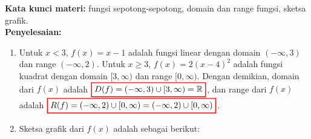 \documentclass[10pt,openany,a4paper]{article}
\theoremstyle{definition}
\theoremstyle{definition}
\theoremstyle{plain}
\newenvironment{jawab}[2][tes]{
\textbf{Kata kunci materi:} #1.\\
\textbf{Penyelesaian:} #2
}{}
\begin{document}
\begin{enumerate}
\begin{jawab}[fungsi sepotong-sepotong, domain dan range fungsi, sketsa grafik]
{\begin{enumerate}
\begin{align*}
                        f(-2) &= -2-1 = -3\\
                        f(1-x^2) &= (1-x^2)-1 = -x^2.
                    \end{align*}
                    Jadi diperoleh $\colorlet{oldcolor}{.}
        \color{red}
        \setlength{\fboxrule}{1pt} \boxed{\color{oldcolor}f(3)=2,~f(-2)=-3,~f(1-x^2)=-x^2}\color{oldcolor}$.
                    \item Untuk $x<3$, $f(x)=x-1$ adalah fungsi linear dengan domain $(-\infty,3)$ dan range $(-\infty,2)$. Untuk $x\geq 3$, $f(x)=2(x-4)^2$ adalah fungsi kuadrat dengan domain $[3,\infty)$ dan range $[0,\infty)$. Dengan demikian, domain dari $f(x)$ adalah $\colorlet{oldcolor}{.}
        \color{red}
        \setlength{\fboxrule}{1pt} \boxed{\color{oldcolor}D(f)=(-\infty,3)\cup[3,\infty) = \mathbb{R}}\color{oldcolor}$, dan range dari $f(x)$ adalah $\colorlet{oldcolor}{.}
        \color{red}
        \setlength{\fboxrule}{1pt} \boxed{\color{oldcolor}R(f)=(-\infty,2)\cup[0,\infty) = (-\infty,2)\cup[0,\infty)}\color{oldcolor}$.
                    \item Sketsa grafik dari $f(x)$ adalah sebagai berikut:
                \end{enumerate}
            }   
                

\end{jawab}
\end{enumerate}
\end{document}
